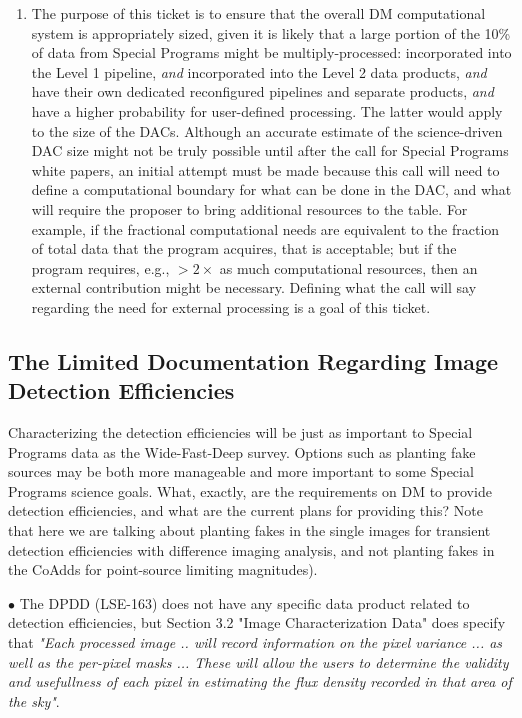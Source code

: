 \documentclass[DM,lsstdraft,toc]{lsstdoc}
\begin{document}
\begin{enumerate}[resume,topsep=-10pt,label= \textbf{Action \Roman*}] \item \label{Size-2} The purpose of this ticket is to ensure that the overall DM computational system is appropriately sized, given it is likely that a large portion of the 10\% of data from Special Programs might be multiply-processed: incorporated into the Level 1 pipeline, \textit{and} incorporated into the Level 2 data products, \textit{and} have their own dedicated reconfigured pipelines and separate products, \textit{and} have a higher probability for user-defined processing. The latter would apply to the size of the DACs. Although an accurate estimate of the science-driven DAC size might not be truly possible until after the call for Special Programs white papers, an initial attempt must be made because this call will need to define a computational boundary for what can be done in the DAC, and what will require the proposer to bring additional resources to the table. For example, if the fractional computational needs are equivalent to the fraction of total data that the program acquires, that is acceptable; but if the program requires, e.g., $>2\times$ as much computational resources, then an external contribution might be necessary. Defining what the call will say regarding the need for external processing is a goal of this ticket. \end{enumerate}

\subsection{The Limited Documentation Regarding Image Detection Efficiencies}

Characterizing the detection efficiencies will be just as important to Special Programs data as the Wide-Fast-Deep survey. Options such as planting fake sources may be both more manageable and more important to some Special Programs science goals. What, exactly, are the requirements on DM to provide detection efficiencies, and what are the current plans for providing this? Note that here we are talking about planting fakes in the single images for transient detection efficiencies with difference imaging analysis, and not planting fakes in the CoAdds for point-source limiting magnitudes).

$\bullet$ The DPDD (LSE-163) does not have any specific data product related to detection efficiencies, but Section 3.2 "Image Characterization Data" does specify that \textit{"Each processed image .. will record information on the pixel variance ... as well as the per-pixel masks ... These will allow the users to determine the validity and usefullness of each pixel in estimating the flux density recorded in that area of the sky"}.
\end{document}
